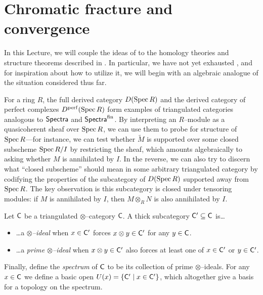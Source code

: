\section{Chromatic fracture and convergence}\label{ChromaticLocalizationSection}

In this Lecture, we will couple the ideas of  to the homology theories and structure theorems described in .  In particular, we have not yet exhausted , and for inspiration about how to utilize it, we will begin with an algebraic analogue of the situation considered thus far.

For a ring $R$, the full derived category $D(\operatorname{Spec} R)$ and the derived category of perfect complexes $D^{\mathrm{perf}}(\operatorname{Spec} R)$ form examples of triangulated categories analogous to $\mathsf{Spectra}$ and $\mathsf{Spectra}^{\mathrm{fin}}$.  By interpreting an $R$--module as a quasicoherent sheaf over $\operatorname{Spec} R$, we can use them to probe for structure of $\operatorname{Spec} R$---for instance, we can test whether $\widetilde M$ is supported over some closed subscheme $\operatorname{Spec} R/I$ by restricting the sheaf, which amounts algebraically to asking whether $M$ is annihilated by $I$.  In the reverse, we can also try to discern what ``closed subscheme'' should mean in some arbitrary triangulated category by codifying the properties of the subcategory of $D(\operatorname{Spec} R)$ supported away from $\operatorname{Spec} R$.  The key observation is this subcategory is closed under tensoring modules: if $M$ is annihilated by $I$, then $M \otimes_R N$ is also annihilated by $I$.

\begin{definition}
Let $\mathsf{C}$ be a triangulated $\otimes$--category $\mathsf{C}$.  A thick subcategory $\mathsf{C}' \subseteq \mathsf{C}$ is\ldots
\begin{itemize}
\item \ldots a \textit{$\otimes$--ideal} when $x \in \mathsf{C}'$ forces $x \otimes y \in \mathsf{C}'$ for any $y \in \mathsf{C}$.
\item \ldots a \textit{prime $\otimes$--ideal} when $x \otimes y \in \mathsf{C}'$ also forces at least one of $x \in \mathsf{C}'$ or $y \in \mathsf{C}'$.
\end{itemize}
Finally, define the \textit{spectrum} of $\mathsf{C}$ to be its collection of prime $\otimes$--ideals.  For any $x \in \mathsf{C}$ we define a basic open $U(x) = \{\mathsf{C}' \mid x \in \mathsf{C}'\}$, which altogether give a basis for a topology on the spectrum.
\end{definition}

